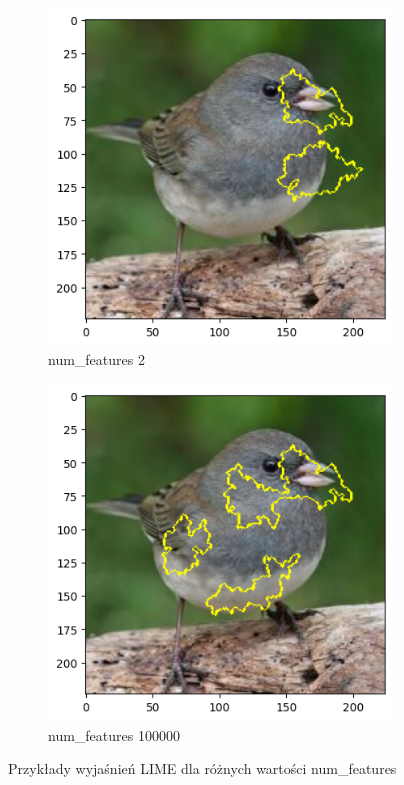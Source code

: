 \begin{figure}
	\centering
	\begin{subfigure}[b]{0.3\textwidth}
		\includegraphics[width=.9\textwidth]{img/parameters/lime/num_features_2}
		\caption{num\_features 2}  \label{rys:parameters_lime_numsamples_5}
	\end{subfigure}
	\begin{subfigure}[b]{0.3\textwidth}
		\centering\includegraphics[width=.9\textwidth]{img/parameters/lime/num_features_100000}
		\caption{num\_features 100000}  \label{rys:parameters_lime_numsamples_1000}
	\end{subfigure}
	\caption{Przykłady wyjaśnień LIME dla różnych wartości num\_features}
\end{figure}

